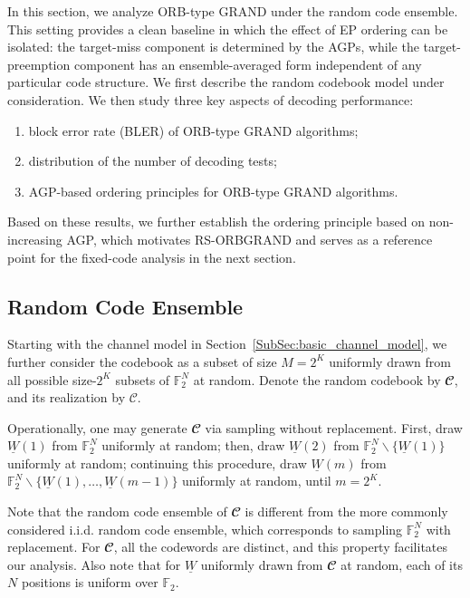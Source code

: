 \documentclass[letterpaper,draftclsnofoot,onecolumn]{IEEEtran}
\begin{document}
In this section, we analyze ORB-type GRAND under the random code ensemble. This setting provides a clean baseline in which the effect of EP ordering can be isolated: the target-miss component is determined by the AGPs, while the target-preemption component has an ensemble-averaged form independent of any particular code structure. We first describe the random codebook model under consideration.
We then study three key aspects of decoding performance:
\begin{enumerate}
    \item block error rate (BLER) of ORB-type GRAND algorithms;
    \item distribution of the number of decoding tests;
    \item AGP-based ordering principles for ORB-type GRAND algorithms.
\end{enumerate}
Based on these results, we further establish the ordering principle based on non-increasing AGP, which motivates RS-ORBGRAND and serves as a reference point for the fixed-code analysis in the next section.

\subsection{Random Code Ensemble}\label{SubSec:channel_model}

Starting with the channel model in Section~\ref{SubSec:basic_channel_model}, we further consider the codebook as a subset of size $M = 2^K$ uniformly drawn from all possible size-$2^K$ subsets of $\mathbb{F}_2^N$ at random. Denote the random codebook by $\mathbfcal{C}$, and its realization by $\mathcal{C}$.

Operationally, one may generate $\mathbfcal{C}$ via sampling without replacement. First, draw $\underline{W}(1)$ from $\mathbb{F}_2^N$ uniformly at random; then, draw $\underline{W}(2)$ from $\mathbb{F}_2^N \backslash \{\underline{W}(1)\}$ uniformly at random; continuing this procedure, draw $\underline{W}(m)$ from $\mathbb{F}_2^N \backslash \{\underline{W}(1), \ldots, \underline{W}(m-1)\}$ uniformly at random, until $m = 2^K$.

Note that the random code ensemble of $\mathbfcal{C}$ is different from the more commonly considered i.i.d. random code ensemble, which corresponds to sampling $\mathbb{F}_2^N$ with replacement. For $\mathbfcal{C}$, all the codewords are distinct, and this property facilitates our analysis. Also note that for $\underline{W}$ uniformly drawn from $\mathbfcal{C}$ at random, each of its $N$ positions is uniform over $\mathbb{F}_2$.
\end{document}
